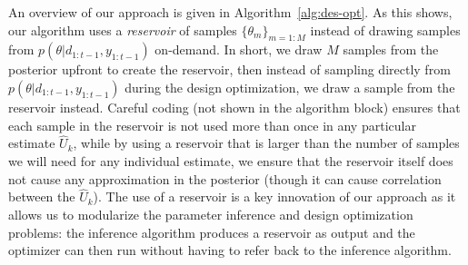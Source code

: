 An overview of our approach is given in Algorithm~\ref{alg:des-opt}.  As this shows, our algorithm uses
a \emph{reservoir} of samples $\{\theta_m\}_{m=1:M}$ instead of drawing samples from 
$p\left(\theta | d_{1:t-1}, y_{1:t-1} \right)$ on-demand.  In short, we draw $M$ samples from the
posterior upfront to create the reservoir, then instead of sampling directly from 
$p\left(\theta | d_{1:t-1}, y_{1:t-1} \right)$ during the design optimization,
we draw a sample from the reservoir instead.  Careful coding (not shown in the algorithm block) ensures 
that each sample in the reservoir is not used more than once in any particular estimate $\hat{U}_k$, while by using
a reservoir that is larger than the number of samples we will need for any individual estimate, we
ensure that the reservoir itself does not cause any approximation in the posterior (though it can cause correlation
between the $\hat{U}_k$).
The use of a reservoir is a key innovation of our approach as it allows
us to modularize the parameter inference and design optimization problems: the inference algorithm
produces a reservoir as output and the optimizer can then run without having to refer back to the
inference algorithm.

